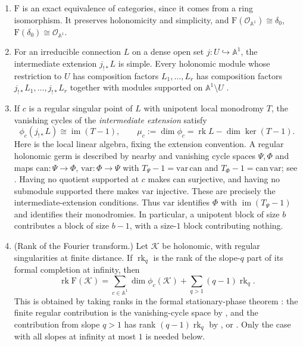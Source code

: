 \documentclass[11pt,a4paper]{article}
\theoremstyle{definition}
\theoremstyle{remark}
\numberwithin{equation}{section}
\newcommand{\A}{\mathbb{A}}
\newcommand{\cO}{\mathcal{O}}
\newcommand{\Four}{\mathrm{F}}
\DeclareMathOperator{\rk}{rk}
\DeclareMathOperator{\im}{im}
\begin{document}
\begin{enumerate}
\item[(F1)] $\Four$ is an exact equivalence of categories, since it comes from a ring isomorphism. It preserves holonomicity and simplicity, and $\Four(\cO_{\A^1})\cong\delta_0$, $\Four(\delta_0)\cong\cO_{\A^1}$.
\item[(F2)] For an irreducible connection $L$ on a dense open set $j:U\hookrightarrow\A^1$, the intermediate extension $j_{!*}L$ is simple. Every holonomic module whose restriction to $U$ has composition factors $L_1,\dots,L_r$ has composition factors $j_{!*}L_1,\dots,j_{!*}L_r$ together with modules supported on $\A^1\setminus U$ \cite{HTT08}.
\item[(F3)] If $c$ is a regular singular point of $L$ with unipotent local monodromy $T$, the vanishing cycles of the \emph{intermediate extension} satisfy
\[
\phi_c(j_{!*}L)\cong\im(T-1),\qquad
\mu_c:=\dim\phi_c=\rk L-\dim\ker(T-1).
\]
Here is the local linear algebra, fixing the extension convention. A regular holonomic germ is described by nearby and vanishing cycle spaces $\Psi,\Phi$ and maps $\mathrm{can}:\Psi\to\Phi$, $\mathrm{var}:\Phi\to\Psi$ with $T_\Psi-1=\mathrm{var}\,\mathrm{can}$ and $T_\Phi-1=\mathrm{can}\,\mathrm{var}$; see \cite[Remark~5.7, p.~326]{Sab08}. Having no quotient supported at $c$ makes $\mathrm{can}$ surjective, and having no submodule supported there makes $\mathrm{var}$ injective. These are precisely the intermediate-extension conditions. Thus $\mathrm{var}$ identifies $\Phi$ with $\im(T_\Psi-1)$ and identifies their monodromies. In particular, a unipotent block of size $b$ contributes a block of size $b-1$, with a size-$1$ block contributing nothing.
\item[(F4)] (Rank of the Fourier transform.) Let $\mathcal K$ be holonomic, with regular singularities at finite distance. If $\rk_q$ is the rank of the slope-$q$ part of its formal completion at infinity, then
\[
\rk\Four(\mathcal K)
 =\sum_{c\in\A^1}\dim\phi_c(\mathcal K)
  +\sum_{q>1}(q-1)\rk_q.
\]
This is obtained by taking ranks in the formal stationary-phase theorem \cite[\S1, theorem ``Formal stationary phase'']{GL04}: the finite regular contribution is the vanishing-cycle space by \cite[Remark~5.7]{Sab08}, and the contribution from slope $q>1$ has rank $(q-1)\rk_q$ by \cite[Prop.~3.14(iii)]{BE04}, or \cite[Remarks~5.11(1)]{Sab08}. Only the case with all slopes at infinity at most $1$ is needed below.

\end{enumerate}
\end{document}
